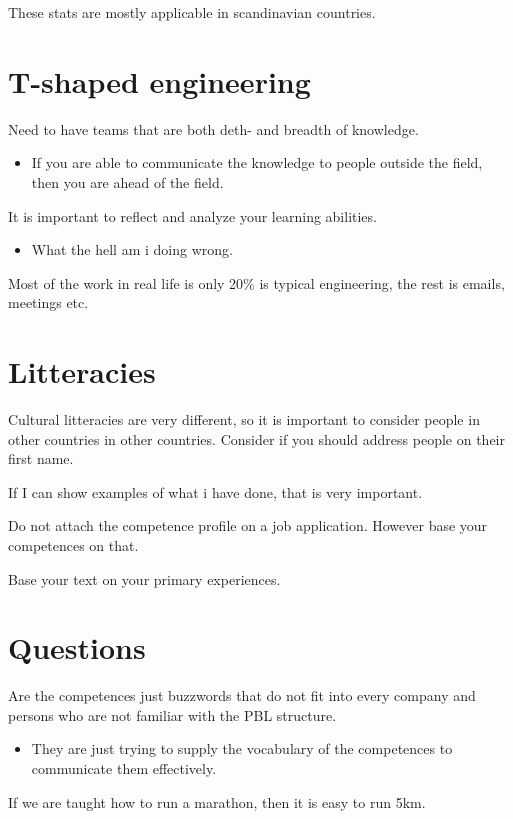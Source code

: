 \documentclass[a4paper]{article}
\begin{document}
These stats are mostly applicable in scandinavian countries. 


\section{T-shaped engineering}
Need to have teams that are both deth- and breadth of knowledge.

\begin{itemize}
	\item If you are able to communicate the knowledge to people outside the field, then you are ahead of the field. 
\end{itemize}

It is important to reflect and analyze your learning abilities.
\begin{itemize}
	\item What the hell am i doing wrong. 
\end{itemize}

Most of the work in real life is only 20\%  is typical engineering, the rest is emails, meetings etc.


\section{Litteracies}
Cultural litteracies are very different, so it is important to consider people in other countries in other countries. Consider if you should address people on their first name. 


If I can show examples of what i have done, that is very important. 


Do not attach the competence profile on a job application. However base your competences on that. 


Base your text on your primary experiences. 

\section{Questions}
Are the competences just buzzwords that do not fit into every company and persons who are not familiar with the PBL structure. 
\begin{itemize}
	\item They are just trying to supply the vocabulary of the competences to communicate them effectively.
\end{itemize}

If we are taught how to run a marathon, then it is easy to run 5km.
\end{document}
